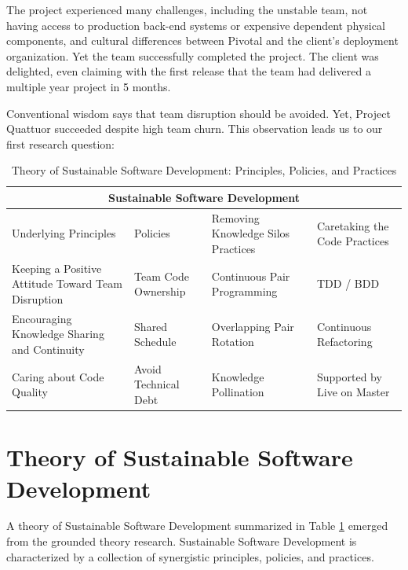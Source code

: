 The project experienced many challenges, including the unstable team, not having access to production back-end systems or expensive dependent physical components, and cultural differences between Pivotal and the client's deployment organization. Yet the team successfully completed the project. The client was delighted, even claiming with the first release that the team had delivered a multiple year project in 5 months. 

Conventional wisdom says that team disruption should be avoided. Yet, Project Quattuor succeeded despite high team churn. This observation leads us to our first research question: 

\begin{table}[t]
\renewcommand{\arraystretch}{1.5}
\centering
\caption{Theory of Sustainable Software Development: Principles, Policies, and Practices}
\label{SustainableSoftwareDevelopmentTable}
\begin{tabular}{|p{1.65in}|p{1.35in}|p{1.8in}|p{1.6in}|}
\hline
\multicolumn{4}{|c|}{Sustainable Software Development}                     \\
\hline
Underlying Principles & Policies                  & Removing Knowledge Silos Practices & Caretaking the Code Practices       \\
\hline
Keeping a Positive Attitude Toward Team Disruption & Team Code Ownership & Continuous Pair Programming         & TDD / BDD                   \\
Encouraging Knowledge Sharing and Continuity & Shared Schedule           & Overlapping Pair Rotation & Continuous Refactoring      \\
Caring about Code Quality  & Avoid Technical Debt      & Knowledge Pollination    & Supported by Live on Master \\ 
\hline
\end{tabular}
\end{table}


\section{Theory of Sustainable Software Development}
\label{Theory}

A theory of Sustainable Software Development summarized in Table \ref{SustainableSoftwareDevelopmentTable} emerged from the grounded theory research. Sustainable Software Development is characterized by a collection of synergistic principles, policies, and practices. 

